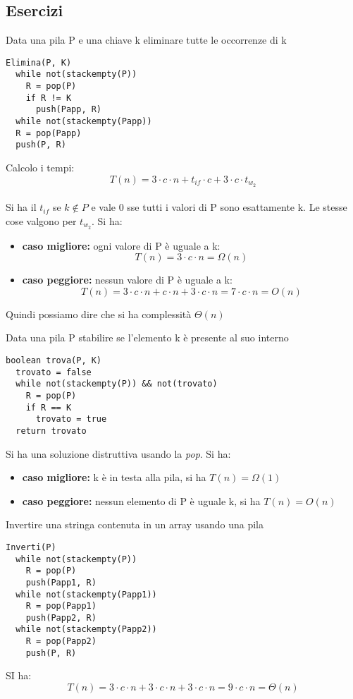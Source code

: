 \documentclass[a4paper,12pt,oneside,tikz]{book}
\begin{document}
\subsection{Esercizi}
\begin{esercizio}
Data una pila P e una chiave k eliminare tutte le occorrenze di k
\begin{verbatim}
Elimina(P, K)
  while not(stackempty(P))
    R = pop(P)
    if R != K
      push(Papp, R)
  while not(stackempty(Papp))
  R = pop(Papp)
  push(P, R)
\end{verbatim}
Calcolo i tempi:
$$T(n)=3\cdot c\cdot n+t_{if}\cdot c+3\cdot c\cdot t_{w_2}$$\\
\newpage
Si ha il $t_{if}$ se $k\not\in P$ e vale 0 sse tutti i valori di P sono esattamente k. Le stesse cose valgono per $t_{w_2}$. Si ha:
\begin{itemize}
\item \textbf{caso migliore:} ogni valore di P è uguale a k:
$$T(n)=3\cdot c\cdot n=\Omega(n)$$
\item \textbf{caso peggiore:} nessun valore di P è uguale  a k:
$$T(n)=3\cdot c\cdot n+c\cdot n+3\cdot c\cdot n= 7\cdot c\cdot n=O(n)$$
\end{itemize}
Quindi possiamo dire che si ha complessità $\Theta(n)$
\end{esercizio}
\begin{esercizio}
Data una pila P stabilire se l'elemento k è presente al suo interno
\begin{verbatim}
boolean trova(P, K)
  trovato = false
  while not(stackempty(P)) && not(trovato)
    R = pop(P)
    if R == K
      trovato = true
  return trovato
\end{verbatim}
Si ha una soluzione distruttiva usando la \textit{pop}. Si ha:
\begin{itemize}
\item \textbf{caso migliore:} k è in testa alla pila, si ha $T(n)=\Omega(1)$
\item \textbf{caso peggiore:} nessun elemento di P è uguale k, si ha $T(n)=O(n)$
\end{itemize}
\end{esercizio}
\begin{esercizio}
Invertire una stringa contenuta in un array usando una pila
\begin{verbatim}
Inverti(P)
  while not(stackempty(P))
    R = pop(P)
    push(Papp1, R)
  while not(stackempty(Papp1))
    R = pop(Papp1)
    push(Papp2, R)
  while not(stackempty(Papp2))
    R = pop(Papp2)
    push(P, R)
\end{verbatim}
SI ha:
$$T(n)=3\cdot c\cdot n+3\cdot c\cdot n+3\cdot c\cdot n=9\cdot c \cdot n=\Theta(n)$$
\end{esercizio}
\end{document}
